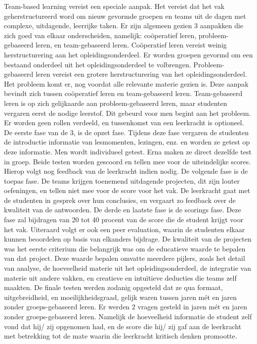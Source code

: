 \documentclass{voorstel}
\begin{document}
	Team-based learning vereist een speciale aanpak. Het vereist dat het vak geherstructureerd word om nieuw gevormde groepen en teams uit de dagen met complexe, uitdagende, leerrijke taken. Er zijn algemeen gezien 3 aanpakken die zich goed van elkaar onderscheiden, namelijk: coöperatief leren, probleem-gebaseerd leren, en team-gebaseerd leren.
	Coöperatief leren vereist weinig herstructurering aan het opleidingsonderdeel. Er worden groepen gevormd om een bestaand onderdeel uit het opleidingsonderdeel te volbrengen.
	Probleem-gebaseerd leren vereist een grotere herstructurering van het opleidingsonderdeel. Het probleem komt er, nog voordat alle relevante materie gezien is. Deze aanpak bevindt zich tussen coöperatief leren en team-gebaseerd leren.
	Team-gebaseerd leren is op zich gelijkaarde aan probleem-gebaseerd leren, maar studenten vergaren eerst de nodige leerstof. Dit gebeurd voor men begint aan het probleem. Er worden geen rollen verdeeld, en tussenkomst van een leerkracht is optioneel.
	De eerste fase van de 3, is de opzet fase. Tijdens deze fase vergaren de studenten de introductie informatie van lesmomenten, lezingen, enz. en worden ze getest op deze informatie. Men wordt individueel getest. Erna maken ze direct dezelfde test in groep. Beide testen worden gescoord en tellen mee voor de uiteindelijke scores. Hierop volgt nog feedback van de leerkracht indien nodig.
	De volgende fase is de toepas fase. De teams krijgen toenemend uitdagende projecten, dit zijn louter oefeningen, en tellen niet mee voor de score voor het vak. De leerkracht gaat met de studenten in gesprek over hun conclusies, en vergaart zo feedback over de kwaliteit van de antwoorden. 
	De derde en laatste fase is de scorings fase. Deze fase zal bijdragen van 20 tot 40 procent van de score die de student krijgt voor het vak. Uiteraard volgt er ook een peer evaluation, waarin de studenten elkaar kunnen beoordelen op basis van elkanders bijdrage.
	De kwaliteit van de projecten was het eerste criterium die belangrijk was om de educatieve waarde te bepalen van dat project. Deze waarde bepalen omvatte meerdere pijlers, zoals het detail van analyse, de hoeveelheid materie uit het opleidingsonderdeel, de integratie van materie uit andere vakken, en creatieve en intuïtieve deducties die teams zelf maakten.
	De finale testen werden zodanig opgesteld dat ze qua formaat, uitgebreidheid, en moeilijkheidsgraad, gelijk waren tussen jaren mét en jaren zonder groeps-gebaseerd leren.
	Er werden 2 vragen gesteld in jaren mét en jaren zonder groeps-gebaseerd leren. Namelijk de hoeveelheid informatie de student zelf vond dat hij/ zij opgenomen had, en de score die hij/ zij gaf aan de leerkracht met betrekking tot de mate waarin die leerkracht kritisch denken promootte.
\end{document}
